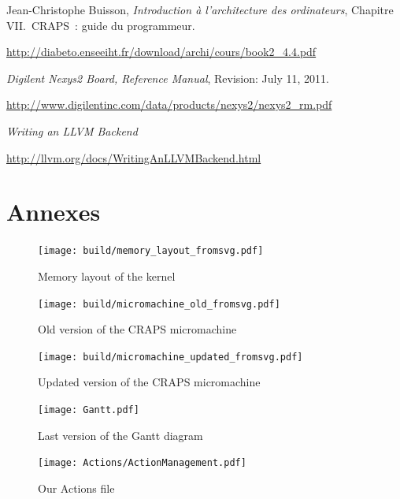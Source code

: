 \documentclass[openany, a4paper]{book}
\begin{document}
  \patchcmd{\thebibliography}{\chapter*}{\chapter}{}{}
  \begin{thebibliography}{9}
      Jean-Christophe Buisson,
      \emph{Introduction à l'architecture des ordinateurs},
      Chapitre VII.\ CRAPS~: guide du programmeur.

      \mbox{\url{http://diabeto.enseeiht.fr/download/archi/cours/book2_4.4.pdf}}

      \emph{Digilent Nexys2 Board, Reference Manual},
      Revision: July 11, 2011.

      \mbox{\url{http://www.digilentinc.com/data/products/nexys2/nexys2_rm.pdf}}

      \emph{Writing an LLVM Backend}

      \mbox{\url{http://llvm.org/docs/WritingAnLLVMBackend.html}}
  \end{thebibliography}

  \chapter{Annexes}
    \begin{figure}
      \centering
      \texttt{[image: build/memory\_layout\_fromsvg.pdf]}
      \caption{Memory layout of the kernel}\label{fig:memory}
    \end{figure}

    \begin{figure}
      \centering
      \texttt{[image: build/micromachine\_old\_fromsvg.pdf]}
      \caption{Old version of the CRAPS micromachine}
    \end{figure}

    \begin{figure}
      \centering
      \texttt{[image: build/micromachine\_updated\_fromsvg.pdf]}
      \caption{Updated version of the CRAPS micromachine}
    \end{figure}

    \begin{figure}
      \centering
      \texttt{[image: Gantt.pdf]}
      \caption{Last version of the Gantt diagram}\label{fig:gantt}
    \end{figure}

    \begin{figure}
        \centering
        \texttt{[image: Actions/ActionManagement.pdf]}
        \caption{Our Actions file}\label{ActionFile}
    \end{figure}
\end{document}
